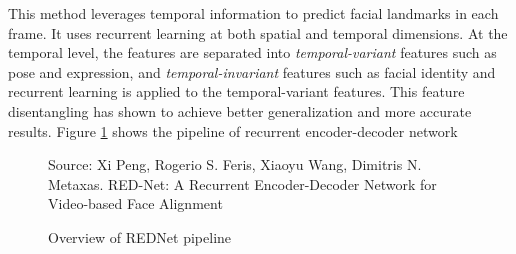 \documentclass{llncs}
\begin{document}
This method leverages temporal information to predict facial landmarks in each frame. It uses recurrent learning at both spatial and temporal dimensions. At the temporal level, the features are separated into \textit{temporal-variant} features such as pose and expression, and \textit{temporal-invariant} features such as facial identity and recurrent learning is applied to the temporal-variant features. This feature disentangling has shown to achieve better generalization and more accurate results. Figure \textcolor{red}{\ref{rednet_architecture}} shows the pipeline of recurrent encoder-decoder network \\

\begin{figure}
%
{Source: Xi Peng, Rogerio S. Feris, Xiaoyu Wang, Dimitris N. Metaxas. RED-Net: A Recurrent Encoder-Decoder Network for Video-based Face Alignment}
\caption{Overview of REDNet pipeline}
\label{rednet_architecture}
\end{figure}
\end{document}
